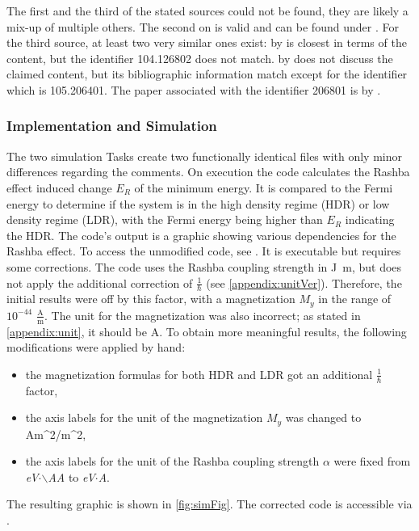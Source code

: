 \documentclass[
	fontsize = 11pt,
	paper = a4,
	draft = false,
	twoside = true,
	titlepage = false
]{scrartcl}
\numberwithin{equation}{subsection}
\begin{document}
	The first and the third of the stated sources could not be found, they are likely a mix-up of multiple others. The second on is valid and can be found under \autocite{param2_PhysRevLett.98.186807}. For the third source, at least two very similar ones exist:  by \citeauthor{param3_like_PhysRevLett.104.126802} \autocite{param3_like_PhysRevLett.104.126802} is closest in terms of the content, but the identifier 104.126802 does not match.  by \citeauthor{param3_similar_PhysRevLett.105.206401} \autocite{param3_similar_PhysRevLett.105.206401} does not discuss the claimed content, but its bibliographic information match except for the identifier which is 105.206401. The paper associated with the identifier 206801 is  by \citeauthor{param3_corNumber_PhysRevLett.105.206801} \autocite{param3_corNumber_PhysRevLett.105.206801}.
	
	\subsubsection{Implementation and Simulation} \label{appendix:impl}
	The two simulation Tasks create two functionally identical files with only minor differences regarding the comments. On execution the code calculates the Rashba effect induced change $E_R$ of the minimum energy. It is compared to the Fermi energy to determine if the system is in the high density regime (HDR) or low density regime (LDR), with the Fermi energy being higher than $E_R$ indicating the HDR. The code's output is a graphic showing various dependencies for the Rashba effect. To access the unmodified code, see \autocite{gitImp}. It is executable but requires some corrections. 
	The code uses the Rashba coupling strength in \si{\joule \meter}, but does not apply the additional correction of $\frac{1}{\hbar}$ (see \autoref{appendix:unitVer}). Therefore, the initial results were off by this factor, with a magnetization $M_y$ in the range of $10^{-44}$ $\frac{\si{\ampere}}{\si{\meter}}$. The unit for the magnetization was also incorrect; as stated in \autoref{appendix:unit}, it should be \si{\ampere}. To obtain more meaningful results, the following modifications were applied by hand:
	\begin{itemize}
		\item the magnetization formulas for both HDR and LDR got an additional $\frac{1}{\hbar}$ factor,
		\item the axis labels for the unit of the magnetization $M_y$ was changed to Am\^{}2/m\^{}2,
		\item the axis labels for the unit of the Rashba coupling strength $\alpha$ were fixed from \textit{eV$\cdot$$\backslash$AA} to \textit{eV$\cdot$A}.
	\end{itemize}
	The resulting graphic is shown in \autoref{fig:simFig}. The corrected code is accessible via \autocite{gitCor}.
	
\end{document}
